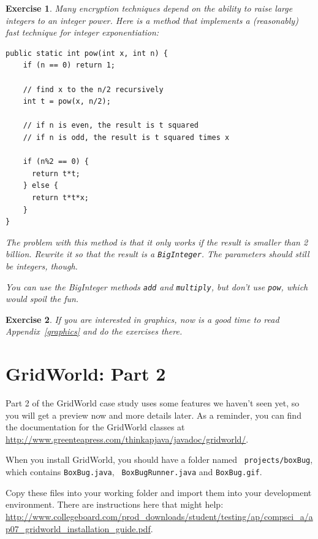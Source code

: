 \documentclass[12pt]{book}
\theoremstyle{exercise}
\newtheorem{exercise}{Exercise}[chapter]
\begin{document}
\begin{exercise}
Many encryption techniques depend on the
ability to raise large integers to an integer power.  Here is a
method that implements a (reasonably) fast technique for integer
exponentiation:

\begin{lstlisting}
public static int pow(int x, int n) {
    if (n == 0) return 1;

    // find x to the n/2 recursively
    int t = pow(x, n/2);

    // if n is even, the result is t squared
    // if n is odd, the result is t squared times x

    if (n%2 == 0) {
      return t*t;
    } else {
      return t*t*x;
    }
}
\end{lstlisting}

The problem with this method is that it only works if the result
is smaller than 2 billion.  Rewrite it so that the result is
a {\tt BigInteger}.  The parameters should still be integers, though.

You can use the BigInteger methods {\tt add} and {\tt multiply}, but
don't use {\tt pow}, which would spoil the fun.
\end{exercise}


\begin{exercise}
If you are interested in graphics, now is a good time to read
Appendix~\ref{graphics} and do the exercises there.
\end{exercise}


\chapter{GridWorld: Part 2}
\label{gridworld2}

Part 2 of the GridWorld case study uses some features we haven't
seen yet, so you will get a preview now and more details later.
As a reminder, you can find the
documentation for the GridWorld classes at
\url{http://www.greenteapress.com/thinkapjava/javadoc/gridworld/}.

When you install GridWorld, you should have a folder named {\tt
  projects/boxBug}, which contains {\tt BoxBug.java}, {\tt
  BoxBugRunner.java} and {\tt BoxBug.gif}.

Copy these files into your working folder and import them into
your development environment.
There are instructions here that
might help: \url{http://www.collegeboard.com/prod_downloads/student/testing/ap/compsci_a/ap07_gridworld_installation_guide.pdf}.
\end{document}
